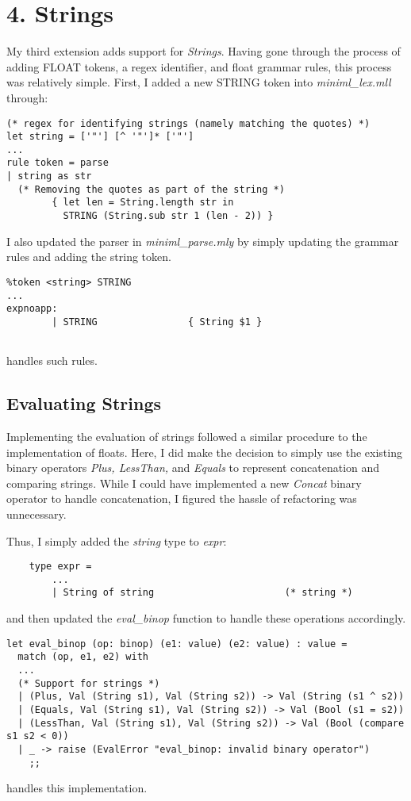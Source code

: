 \documentclass[12pt]{article}
\begin{document}
\section*{4. Strings}
My third extension adds support for \textit{Strings}. Having gone through the process of adding FLOAT tokens, a regex identifier, and float grammar rules, this process was relatively simple. First, I added a new STRING token into \textit{miniml\_lex.mll} through: 
\begin{verbatim}
(* regex for identifying strings (namely matching the quotes) *)
let string = ['"'] [^ '"']* ['"']
...
rule token = parse
| string as str 
  (* Removing the quotes as part of the string *)
        { let len = String.length str in
          STRING (String.sub str 1 (len - 2)) }
\end{verbatim}

I also updated the parser in \textit{miniml\_parse.mly} by simply updating the grammar rules and adding the string token.
\begin{verbatim}
%token <string> STRING 
...
expnoapp: 
        | STRING                { String $1 }
    
\end{verbatim}
handles such rules.

\subsection*{Evaluating Strings}
Implementing the evaluation of strings followed a similar procedure to the implementation of floats. Here, I did make the decision to simply use the existing binary operators \textit{Plus, LessThan, } and \textit{Equals} to represent concatenation and comparing strings. While I could have implemented a new \textit{Concat} binary operator to handle concatenation, I figured the hassle of refactoring was unnecessary.

Thus, I simply added the \textit{string} type to \textit{expr}:

\begin{verbatim}
    type expr =
        ...
        | String of string                       (* string *)
\end{verbatim}

and then updated the \textit{eval\_binop} function to handle these operations accordingly.

\begin{verbatim}
let eval_binop (op: binop) (e1: value) (e2: value) : value =
  match (op, e1, e2) with
  ...
  (* Support for strings *)
  | (Plus, Val (String s1), Val (String s2)) -> Val (String (s1 ^ s2))
  | (Equals, Val (String s1), Val (String s2)) -> Val (Bool (s1 = s2))
  | (LessThan, Val (String s1), Val (String s2)) -> Val (Bool (compare s1 s2 < 0))
  | _ -> raise (EvalError "eval_binop: invalid binary operator")
    ;;
\end{verbatim}
handles this implementation.\newline 
\end{document}
